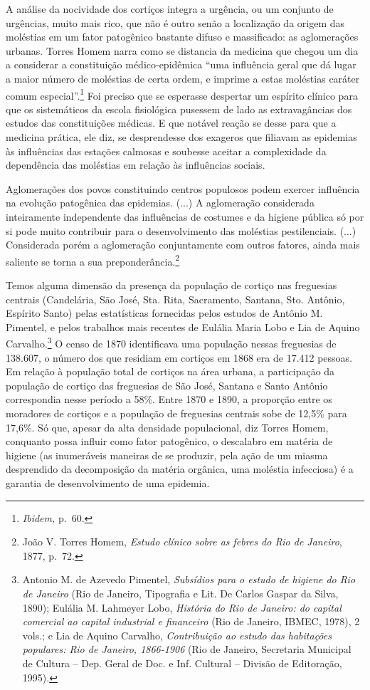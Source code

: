 A análise da nocividade dos cortiços integra a urgência, ou um conjunto
de urgências, muito mais rico, que não é outro senão a localização da
origem das moléstias em um fator patogênico bastante difuso e
massificado: as aglomerações urbanas. Torres Homem narra como se
distancia da medicina que chegou um dia a considerar a constituição
médico-epidêmica ``uma influência geral que dá lugar a maior número de
moléstias de certa ordem, e imprime a estas moléstias caráter comum
especial''.\footnote{\emph{Ibidem,} p.~60.} Foi preciso que se esperasse
despertar um espírito clínico para que os sistemáticos da escola
fisiológica pusessem de lado as extravagâncias dos estudos das
constituições médicas. E que notável reação se desse para que a medicina
prática, ele diz, se desprendesse dos exageros que filiavam as epidemias
às influências das estações calmosas e soubesse aceitar a complexidade
da dependência das moléstias em relação às influências sociais.

Aglomerações dos povos constituindo centros populosos podem exercer
influência na evolução patogênica das epidemias. (...) A aglomeração
considerada inteiramente independente das influências de costumes e da
higiene pública só por si pode muito contribuir para o desenvolvimento
das moléstias pestilenciais. (...) Considerada porém a aglomeração
conjuntamente com outros fatores, ainda mais saliente se torna a sua
preponderância.\footnote{João V. Torres Homem, \emph{Estudo clínico
  sobre as febres do Rio de Janeiro}, 1877, p.~72.}

Temos alguma dimensão da presença da população de cortiço nas freguesias
centrais (Candelária, São José, Sta. Rita, Sacramento, Santana, Sto.
Antônio, Espírito Santo) pelas estatísticas fornecidas pelos estudos de
Antônio M. Pimentel, e pelos trabalhos mais recentes de Eulália Maria
Lobo e Lia de Aquino Carvalho.\footnote{Antonio M. de Azevedo Pimentel,
  \emph{Subsídios para o estudo de higiene do Rio de Janeiro} (Rio de
  Janeiro, Tipografia e Lit. De Carlos Gaspar da Silva, 1890); Eulália
  M. Lahmeyer Lobo, \emph{História do Rio de Janeiro: do capital
  comercial ao capital industrial e financeiro} (Rio de Janeiro, IBMEC,
  1978), 2 vols.; e Lia de Aquino Carvalho, \emph{Contribuição ao estudo
  das habitações populares: Rio de Janeiro, 1866-1906} (Rio de Janeiro,
  Secretaria Municipal de Cultura -- Dep. Geral de Doc. e Inf. Cultural
  -- Divisão de Editoração, 1995).} O censo de 1870 identificava uma
população nessas freguesias de 138.607, o número dos que residiam em
cortiços em 1868 era de 17.412 pessoas. Em relação à população total de
cortiços na área urbana, a participação da população de cortiço das
freguesias de São José, Santana e Santo Antônio correspondia nesse
período a 58\%. Entre 1870 e 1890, a proporção entre os moradores de
cortiços e a população de freguesias centrais sobe de 12,5\% para
17,6\%. Só que, apesar da alta densidade populacional, diz Torres Homem,
conquanto possa influir como fator patogênico, o descalabro em matéria
de higiene (as inumeráveis maneiras de se produzir, pela ação de um
miasma desprendido da decomposição da matéria orgânica, uma moléstia
infecciosa) é a garantia de desenvolvimento de uma epidemia.

